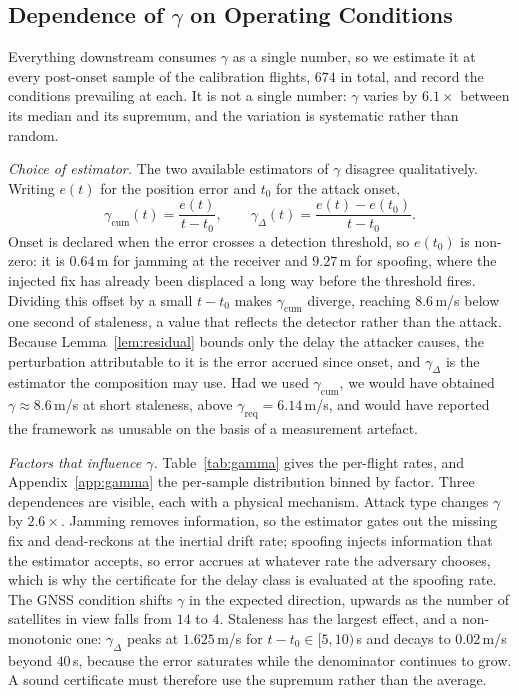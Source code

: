 \documentclass[conference,letterpaper,10pt]{IEEEtran}   %
\begin{document}
\subsection{Dependence of $\gamma$ on Operating Conditions}
\label{sec:gammastability}
Everything downstream consumes $\gamma$ as a single number, so we estimate it
at every post-onset sample of the calibration flights, $674$ in total, and
record the conditions prevailing at each. It is not a single number: $\gamma$
varies by $6.1\times$ between its median and its supremum, and the variation is
systematic rather than random.

\emph{Choice of estimator.} The two available estimators of $\gamma$ disagree
qualitatively. Writing $e(t)$ for the position error and $t_0$ for the attack
onset,
\begin{equation}
\label{eq:gammaest}
\gamma_{\mathrm{cum}}(t)=\frac{e(t)}{t-t_0},
\qquad
\gamma_{\Delta}(t)=\frac{e(t)-e(t_0)}{t-t_0}.
\end{equation}
Onset is declared when the error crosses a detection threshold, so $e(t_0)$ is
non-zero: it is $0.64$\,m for jamming at the receiver and $9.27$\,m for
spoofing, where the injected fix has already been displaced a long way before
the threshold fires. Dividing this offset by a small $t-t_0$ makes
$\gamma_{\mathrm{cum}}$ diverge, reaching $8.6$\,m/s below one second of
staleness, a value that reflects the detector rather than the attack. Because
Lemma~\ref{lem:residual} bounds only the delay the attacker causes, the
perturbation attributable to it is the error accrued since onset, and
$\gamma_{\Delta}$ is the estimator the composition may use. Had we used
$\gamma_{\mathrm{cum}}$, we would have obtained $\gamma\approx8.6$\,m/s at short
staleness, above $\gamma_{\mathrm{req}}=6.14$\,m/s, and would have reported the
framework as unusable on the basis of a measurement artefact.

\emph{Factors that influence $\gamma$.} Table~\ref{tab:gamma} gives the
per-flight rates, and Appendix~\ref{app:gamma} the per-sample distribution
binned by factor. Three dependences are visible, each with a physical
mechanism. Attack type changes $\gamma$ by $2.6\times$. Jamming removes
information, so the estimator gates out the missing fix and dead-reckons at the
inertial drift rate; spoofing injects information that the estimator accepts,
so error accrues at whatever rate the adversary chooses, which is why the
certificate for the delay class is evaluated at the spoofing rate. The GNSS condition shifts $\gamma$ in
the expected direction, upwards as the number of satellites in view falls from
$14$ to $4$. Staleness has the largest effect, and a non-monotonic one:
$\gamma_{\Delta}$ peaks at $1.625$\,m/s for $t-t_0\in[5,10)$\,s and decays to
$0.02$\,m/s beyond $40$\,s, because the error saturates while the denominator
continues to grow. A sound certificate must therefore use the supremum rather
than the average.
\end{document}
